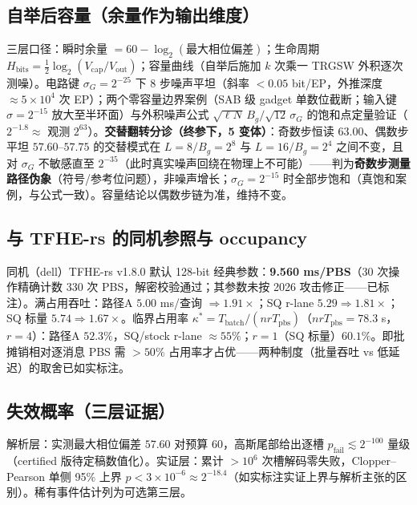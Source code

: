 \documentclass[11pt]{article}
\begin{document}
\subsection{自举后容量（余量作为输出维度）}

三层口径：瞬时余量 $= 60-\log_2(\text{最大相位偏差})$；生命周期 $H_{\mathrm{bits}}=\tfrac12\log_2(V_{\mathrm{cap}}/V_{\mathrm{out}})$；容量曲线（自举后施加 $k$ 次乘一 TRGSW 外积逐次测噪）。电路键 $\sigma_G{=}2^{-25}$ 下 8 步噪声平坦（斜率 $<0.05$ bit/EP，外推深度 $\approx 5\times10^4$ 次 EP）；两个零容量边界案例（SAB 级 gadget 单数位截断；输入键 $\sigma{=}2^{-15}$ 放大至半环面）与外积噪声公式 $\sqrt{\ell N}\,B_g/\sqrt{12}\,\sigma_G$ 的饱和点定量验证（$2^{-1.8}\approx$ 观测 $2^{63}$）。\textbf{交替翻转分诊（终参下，5 变体）}：奇数步恒读 $63.00$、偶数步平坦 $57.60$--$57.75$ 的交替模式在 $L{=}8/B_g{=}2^8$ 与 $L{=}16/B_g{=}2^4$ 之间不变，且对 $\sigma_G$ 不敏感直至 $2^{-35}$（此时真实噪声回绕在物理上不可能）——判为\textbf{奇数步测量路径伪象}（符号/参考位问题），非噪声增长；$\sigma_G{=}2^{-15}$ 时全部步饱和（真饱和案例，与公式一致）。容量结论以偶数步链为准，维持不变。

\subsection{与 TFHE-rs 的同机参照与 occupancy}

同机（dell）TFHE-rs v1.8.0 默认 128-bit 经典参数：\textbf{9.560 ms/PBS}（30 次操作精确计数 330 次 PBS，解密校验通过；其参数未按 2026 攻击修正——已标注）。满占用吞吐：路径A $5.00$ ms/查询 $\Rightarrow 1.91\times$；SQ r-lane $5.29\Rightarrow 1.81\times$；SQ 标量 $5.74\Rightarrow 1.67\times$。临界占用率 $\kappa^\ast = T_{\mathrm{batch}}/(nrT_{\mathrm{pbs}})$（$nrT_{\mathrm{pbs}}{=}78.3$ s，$r{=}4$）：路径A $52.3\%$，SQ/stock r-lane $\approx 55\%$；$r{=}1$（SQ 标量）$60.1\%$。即批摊销相对逐消息 PBS 需 $>\!50\%$ 占用率才占优——两种制度（批量吞吐 vs 低延迟）的取舍已如实标注。

\subsection{失效概率（三层证据）}

解析层：实测最大相位偏差 $57.60$ 对预算 $60$，高斯尾部给出逐槽 $p_{\mathrm{fail}}\lesssim 2^{-100}$ 量级（certified 版待定稿数值化）。实证层：累计 $>10^6$ 次槽解码零失败，Clopper--Pearson 单侧 95\% 上界 $p<3\times10^{-6}\approx 2^{-18.4}$（如实标注实证上界与解析主张的区别）。稀有事件估计列为可选第三层。
\end{document}
